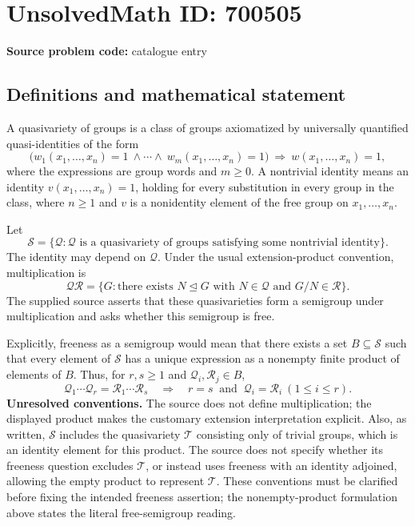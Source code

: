 \documentclass[11pt]{article}
\begin{document}
\section*{UnsolvedMath ID: 700505}
\textbf{Source problem code:} catalogue entry
\subsection{Definitions and mathematical statement}
A quasivariety of groups is a class of groups axiomatized by universally quantified quasi-identities of the form
\[
\bigl(w_1(x_1,\ldots,x_n)=1\ \land\cdots\land\ w_m(x_1,\ldots,x_n)=1\bigr)\ \Longrightarrow\ w(x_1,\ldots,x_n)=1,
\]
where the expressions are group words and \(m\geq 0\). A nontrivial identity means an identity \(v(x_1,\ldots,x_n)=1\), holding for every substitution in every group in the class, where \(n\geq 1\) and \(v\) is a nonidentity element of the free group on \(x_1,\ldots,x_n\).

Let
\[
\mathcal S=\{\mathcal Q:\mathcal Q\text{ is a quasivariety of groups satisfying some nontrivial identity}\}.
\]
The identity may depend on \(\mathcal Q\). Under the usual extension-product convention, multiplication is
\[
\mathcal Q\mathcal R
=\{G:\text{there exists }N\trianglelefteq G\text{ with }N\in\mathcal Q\text{ and }G/N\in\mathcal R\}.
\]
The supplied source asserts that these quasivarieties form a semigroup under multiplication and asks whether this semigroup is free.

Explicitly, freeness as a semigroup would mean that there exists a set \(B\subseteq\mathcal S\) such that every element of \(\mathcal S\) has a unique expression as a nonempty finite product of elements of \(B\). Thus, for \(r,s\geq 1\) and \(\mathcal Q_i,\mathcal R_j\in B\),
\[
\mathcal Q_1\cdots\mathcal Q_r=\mathcal R_1\cdots\mathcal R_s
\quad\Longrightarrow\quad
r=s\ \text{ and }\ \mathcal Q_i=\mathcal R_i\ (1\leq i\leq r).
\]
\textbf{Unresolved conventions.} The source does not define multiplication; the displayed product makes the customary extension interpretation explicit. Also, as written, \(\mathcal S\) includes the quasivariety \(\mathcal T\) consisting only of trivial groups, which is an identity element for this product. The source does not specify whether its freeness question excludes \(\mathcal T\), or instead uses freeness with an identity adjoined, allowing the empty product to represent \(\mathcal T\). These conventions must be clarified before fixing the intended freeness assertion; the nonempty-product formulation above states the literal free-semigroup reading.
\end{document}
